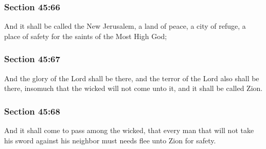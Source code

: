 	\subsubsection{Section 45:66} %
		\label{DC45-66}

		And it shall be called the New Jerusalem, a land of peace, a city of refuge, a place of safety for the saints of the Most High God;


	\subsubsection{Section 45:67} %
		\label{DC45-67}

		And the glory of the Lord shall be there, and the terror of the Lord also shall be there, insomuch that the wicked will not come unto it, and it shall be called Zion.


	\subsubsection{Section 45:68} %
		\label{DC45-68}

		And it shall come to pass among the wicked, that every man that will not take his sword against his neighbor must needs flee unto Zion for safety.


